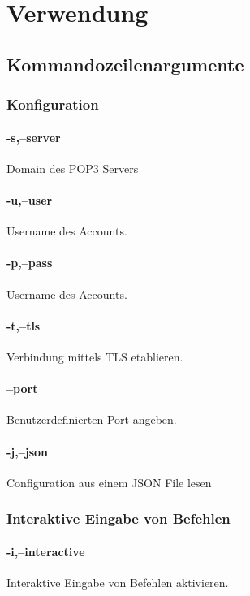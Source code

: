 \documentclass[12pt, letterpaper]{article}
\begin{document}
\section{Verwendung}
\label{usage}

\subsection{Kommandozeilenargumente}

\subsubsection{Konfiguration}
\paragraph{-s,--server}
Domain des POP3 Servers

\paragraph{-u,--user}
Username des Accounts.

\paragraph{-p,--pass}
Username des Accounts.

\paragraph{-t,--tls}
Verbindung mittels TLS etablieren.

\paragraph{--port}
Benutzerdefinierten Port angeben.

\paragraph{-j,--json}
Configuration aus einem JSON File lesen

\subsubsection{Interaktive Eingabe von Befehlen}
\paragraph{-i,--interactive}
Interaktive Eingabe von Befehlen aktivieren.
\end{document}
